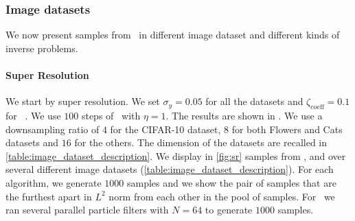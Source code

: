 \subsubsection{Image datasets}
We now present samples from \algo\ in different image dataset and different kinds of inverse problems.
\paragraph*{Super Resolution}
%
We start by super resolution.
We set $\sigma_y = 0.05$ for all the datasets
and $\zeta_{\mathrm{coeff}} = 0.1$ for \dps\ . We use $100$ steps of \ddim\ with $\eta=1$. The results are shown in .
We use a downsampling ratio of $4$ for the CIFAR-10 dataset, $8$ for both Flowers and Cats datasets and $16$ for the others.
The dimension of the datasets are recalled in \cref{table:image_dataset_description}.
We display in \cref{fig:sr} samples from \algo, \dps and \ddrm over several different image datasets (\cref{table:image_dataset_description}).
For each algorithm, we
generate $1000$ samples and we show the pair of samples that are the furthest apart in $L^2$ norm from each other in the pool of samples.
For \algo\ we ran several parallel particle filters with $N=64$ to generate $1000$ samples.
%
